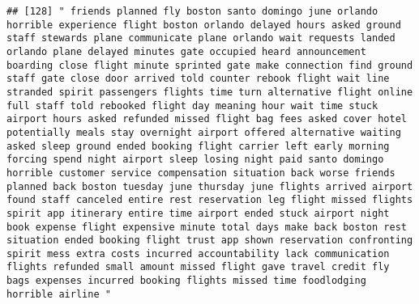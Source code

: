 \documentclass[
]{article}
\begin{document}
\begin{verbatim}
## [128] " friends planned fly boston santo domingo june orlando horrible experience flight boston orlando delayed hours asked ground staff stewards plane communicate plane orlando wait requests landed orlando plane delayed minutes gate occupied heard announcement boarding close flight minute sprinted gate make connection find ground staff gate close door arrived told counter rebook flight wait line stranded spirit passengers flights time turn alternative flight online full staff told rebooked flight day meaning hour wait time stuck airport hours asked refunded missed flight bag fees asked cover hotel potentially meals stay overnight airport offered alternative waiting asked sleep ground ended booking flight carrier left early morning forcing spend night airport sleep losing night paid santo domingo horrible customer service compensation situation back worse friends planned back boston tuesday june thursday june flights arrived airport found staff canceled entire rest reservation leg flight missed flights spirit app itinerary entire time airport ended stuck airport night book expense flight expensive minute total days make back boston rest situation ended booking flight trust app shown reservation confronting spirit mess extra costs incurred accountability lack communication flights refunded small amount missed flight gave travel credit fly bags expenses incurred booking flights missed time foodlodging horrible airline "                                                                                                                                                                                                                                                                                                     

\end{verbatim}
\end{document}
